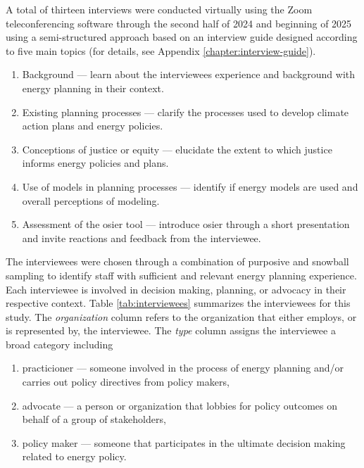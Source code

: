 A total of thirteen interviews were conducted virtually using the Zoom
teleconferencing software through the second half of 2024 and beginning of 2025
using a semi-structured approach based on an interview guide designed according
to five main topics (for details, see Appendix \ref{chapter:interview-guide}).
\begin{enumerate}
    \item Background --- learn about the interviewees experience and background
    with energy planning in their context.
    \item Existing planning processes --- clarify the processes used to develop
    climate action plans and energy policies.
    \item Conceptions of justice or equity --- elucidate the extent to which
    justice informs energy policies and plans.
    \item Use of models in planning processes --- identify if energy models are
    used and overall perceptions of modeling.
    \item Assessment of the \ac{osier} tool --- introduce \ac{osier} through a
    short presentation and invite reactions and feedback from the interviewee.
\end{enumerate}
The interviewees were chosen through a combination of purposive and snowball
sampling to identify staff with sufficient and relevant energy planning
experience. Each interviewee is involved in decision making, planning, or
advocacy in their respective context. Table \ref{tab:interviewees} summarizes
the interviewees for this study. The \textit{organization} column refers to the
organization that either employs, or is represented by, the interviewee. The
\textit{type} column assigns the interviewee a broad category including
\begin{enumerate}
    \item practicioner --- someone involved in the process of energy planning
    and/or carries out policy directives from policy makers,
    \item advocate --- a person or organization that lobbies for policy outcomes
    on behalf of a group of stakeholders,
    \item policy maker --- someone that participates in the ultimate decision
    making related to energy policy.
\end{enumerate}
    
